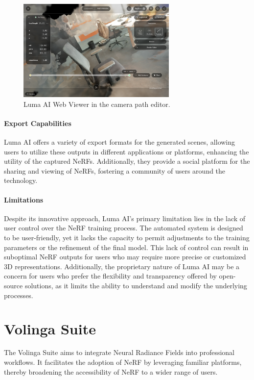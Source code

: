\begin{figure}[h!]
  \centering
  \includegraphics[width=0.7\textwidth]{figures/related-luma.png}
  \caption{Luma AI Web Viewer in the camera path editor.}
  \label{fig:luma-viewer}
\end{figure}

\paragraph{Export Capabilities}
Luma AI offers a variety of export formats for the generated scenes, allowing users to utilize these outputs in different applications or platforms, enhancing the utility of the captured NeRFs.
Additionally, they provide a social platform for the sharing and viewing of NeRFs, fostering a community of users around the technology.

\paragraph{Limitations}
Despite its innovative approach, Luma AI's primary limitation lies in the lack of user control over the NeRF training process.
The automated system is designed to be user-friendly, yet it lacks the capacity to permit adjustments to the training parameters or the refinement of the final model.
This lack of control can result in suboptimal NeRF outputs for users who may require more precise or customized 3D representations.
Additionally, the proprietary nature of Luma AI may be a concern for users who prefer the flexibility and transparency offered by open-source solutions, as it limits the ability to understand and modify the underlying processes.

\section{Volinga Suite}

The Volinga Suite \cite{noauthor_volinga_nodate} aims to integrate Neural Radiance Fields into professional workflows.
It facilitates the adoption of NeRF by leveraging familiar platforms, thereby broadening the accessibility of NeRF to a wider range of users.

